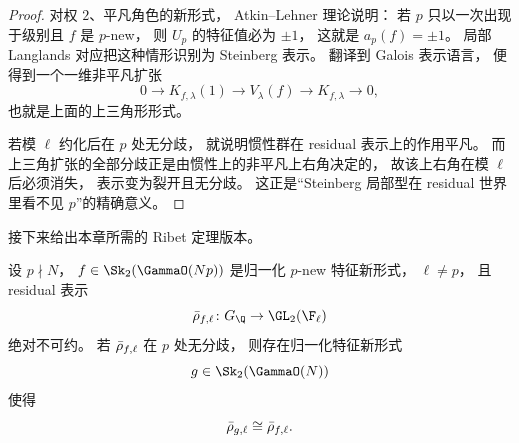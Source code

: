 \begin{proof}
对权 $2$、平凡角色的新形式，
Atkin--Lehner 理论说明：
若 $p$ 只以一次出现于级别且 $f$ 是 $p$-new，
则 $U_p$ 的特征值必为 $\pm1$，
这就是 $a_p(f)=\pm1$。
局部 Langlands 对应把这种情形识别为 Steinberg 表示。
翻译到 Galois 表示语言，
便得到一个一维非平凡扩张
\[
  0\to K_{f,\lambda}(1)\to V_\lambda(f)\to K_{f,\lambda}\to 0,
\]
也就是上面的上三角形形式。

若模 $\ell$ 约化后在 $p$ 处无分歧，
就说明惯性群在 residual 表示上的作用平凡。
而上三角扩张的全部分歧正是由惯性上的非平凡上右角决定的，
故该上右角在模 $\ell$ 后必须消失，
表示变为裂开且无分歧。
这正是“Steinberg 局部型在 residual 世界里看不见 $p$”的精确意义。
\end{proof}

接下来给出本章所需的 Ribet 定理版本。

\begin{theorem}
\label{thm:ch09-ribet-level-lowering}
设 $p\nmid N$，
$f\in \Sk_2(\GammaO(Np))$ 是归一化 $p$-new 特征新形式，
$\ell\neq p$，
且 residual 表示
\[
  \rhobar_{f,\ell}\colon G_\Q\to \GL_2(\F_\ell)
\]
绝对不可约。
若 $\bar{\rho}_{f,\ell}$ 在 $p$ 处无分歧，
则存在归一化特征新形式
\[
  g\in \Sk_2(\GammaO(N))
\]
使得
\[
  \bar{\rho}_{g,\ell}\cong \bar{\rho}_{f,\ell}.
\]
\end{theorem}

